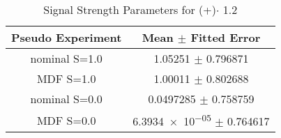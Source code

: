 \begin{table}
\centering
\caption{Signal Strength Parameters for (\ttbar+\bbbar)$\cdot $ \num[round-precision=1]{1.2}}
\begin{tabular}{cc}
\toprule
Pseudo Experiment & Mean $\pm$ Fitted Error\\
\midrule
nominal S=1.0 & \num{1.05251} $\pm$ \num{0.796871}\\
MDF S=1.0 & \num{1.00011} $\pm$ \num{0.802688}\\
nominal S=0.0 & \num{0.0497285} $\pm$ \num{0.758759}\\
MDF S=0.0 & \num{6.3934e-05} $\pm$ \num{0.764617}\\
\bottomrule
\end{tabular}
\end{table}